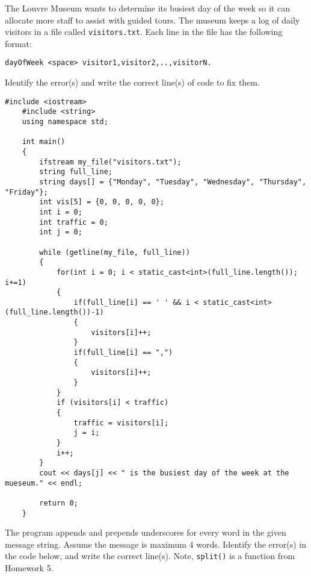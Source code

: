 
\begin{multipart}
The Louvre Museum wants to determine its busiest day of the week so it can allocate more staff to assist with guided tours. The museum keeps a log of daily visitors in a file called \texttt{visitors.txt}. Each line in the file has the following format:

\texttt{dayOfWeek <space> visitor1,visitor2,..,visitorN.}

Identify the error(s) and write the correct line(s) of code to fix them.
\end{multipart}


\begin{verbatim}
#include <iostream>
    #include <string>
    using namespace std;
    
    int main()
    {
        ifstream my_file("visitors.txt"); 
        string full_line;
        string days[] = {"Monday", "Tuesday", "Wednesday", "Thursday", "Friday"};
        int vis[5] = {0, 0, 0, 0, 0}; 
        int i = 0;
        int traffic = 0;
        int j = 0;
    
        while (getline(my_file, full_line))
        {
            for(int i = 0; i < static_cast<int>(full_line.length()); i+=1) 
            {
                if(full_line[i] == ' ' && i < static_cast<int>(full_line.length())-1)
                {
                    visitors[i]++;
                }
                if(full_line[i] == ",") 
                {
                    visitors[i]++;
                }
            }
            if (visitors[i] < traffic) 
            {
                traffic = visitors[i];
                j = i;
            }
            i++;
        }
        cout << days[j] << " is the busiest day of the week at the mueseum." << endl;
    
        return 0;
    }
\end{verbatim}


\begin{multipart}
 The program appends and prepends underscores for every word in the given message string. Assume the message is maximum 4 words. Identify the error(s) in the code below, and write the correct line(s). Note, \texttt{split()} is a function from Homework 5.
\end{multipart}

